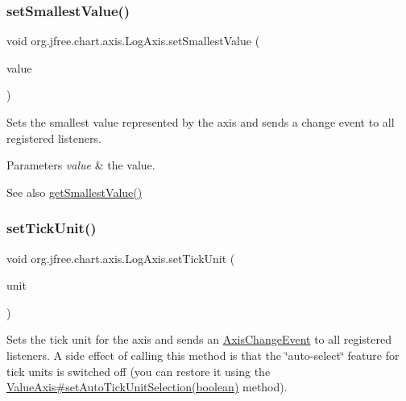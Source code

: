 \subsubsection{\texorpdfstring{set\+Smallest\+Value()}{setSmallestValue()}}
{\footnotesize\ttfamily void org.\+jfree.\+chart.\+axis.\+Log\+Axis.\+set\+Smallest\+Value (\begin{DoxyParamCaption}\item[{double}]{value }\end{DoxyParamCaption})}

Sets the smallest value represented by the axis and sends a change event to all registered listeners.


\begin{DoxyParams}{Parameters}
{\em value} & the value.\\
\hline
\end{DoxyParams}
\begin{DoxySeeAlso}{See also}
\mbox{\hyperlink{classorg_1_1jfree_1_1chart_1_1axis_1_1_log_axis_a790a3c747f54b4082793c83b4321cd13}{get\+Smallest\+Value()}} 
\end{DoxySeeAlso}
\mbox{\label{classorg_1_1jfree_1_1chart_1_1axis_1_1_log_axis_ac1dd10ceeb8bdc6c1d0631d7fa5f39ad}} 
\subsubsection{\texorpdfstring{set\+Tick\+Unit()}{setTickUnit()}\hspace{0.1cm}{\footnotesize\ttfamily [1/2]}}
{\footnotesize\ttfamily void org.\+jfree.\+chart.\+axis.\+Log\+Axis.\+set\+Tick\+Unit (\begin{DoxyParamCaption}\item[{\mbox{\hyperlink{classorg_1_1jfree_1_1chart_1_1axis_1_1_number_tick_unit}{Number\+Tick\+Unit}}}]{unit }\end{DoxyParamCaption})}

Sets the tick unit for the axis and sends an \mbox{\hyperlink{}{Axis\+Change\+Event}} to all registered listeners. A side effect of calling this method is that the \char`\"{}auto-\/select\char`\"{} feature for tick units is switched off (you can restore it using the \mbox{\hyperlink{classorg_1_1jfree_1_1chart_1_1axis_1_1_value_axis_a7366393f75b07420136f449d351deb08}{Value\+Axis\#set\+Auto\+Tick\+Unit\+Selection(boolean)}} method).


